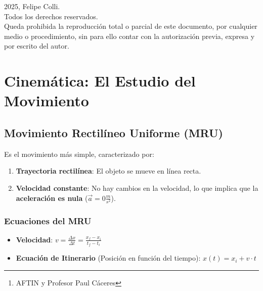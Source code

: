 \documentclass[11pt]{article}
\author{Felipe Colli \thanks{AFTIN y Profesor Paul Cáceres}}
\date{Versión: \today}
\begin{document}
\maketitle

\thispagestyle{empty} %
\vfill %
\begin{center}
	\small
	\textcopyright{} 2025, Felipe Colli. \\
	Todos los derechos reservados. \\
	\vspace{0.5cm} %
	Queda prohibida la reproducción total o parcial de este documento, por cualquier medio o procedimiento, sin para ello contar con la autorización previa, expresa y por escrito del autor.
\end{center}


\tableofcontents
\newpage

\section{Cinemática: El Estudio del Movimiento}
\label{sec:cinematica}


\subsection{Movimiento Rectilíneo Uniforme (MRU)}
Es el movimiento más simple, caracterizado por:
\begin{enumerate}
	\item \textbf{Trayectoria rectilínea}: El objeto se mueve en línea recta.
	\item \textbf{Velocidad constante}: No hay cambios en la velocidad, lo que implica que la \textbf{aceleración es nula} ($\vec{a}=0 \frac{m}{s^2}$).
\end{enumerate}

\subsubsection{Ecuaciones del MRU}
\begin{itemize}
	\item \textbf{Velocidad}: $v = \frac{\Delta x}{\Delta t} = \frac{x_f - x_i}{t_f - t_i}$
	\item \textbf{Ecuación de Itinerario} (Posición en función del tiempo): $x(t) = x_i + v \cdot t$
\end{itemize}
\end{document}
